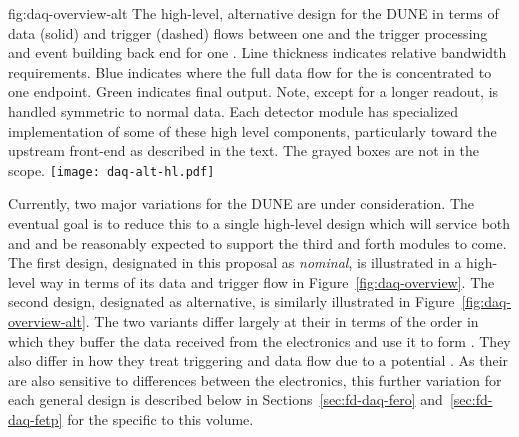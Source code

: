 \begin{dunefigure}{fig:daq-overview-alt}
  {The high-level, alternative design for the DUNE   in
    terms of data (solid) and trigger (dashed) flows between one
      and the trigger processing and event
    building back end for one . 
    Line thickness indicates relative bandwidth requirements.
    Blue indicates where the full data flow for the  is
    concentrated to one endpoint.
    Green indicates final output.
    Note, except for a longer readout,  is handled
    symmetric to normal data.
    Each detector module has specialized implementation of some of
    these high level components, particularly toward the upstream
    front-end as described in the text. 
    The grayed boxes are not in the  scope.
  }
  \texttt{[image: daq-alt-hl.pdf]}%
\end{dunefigure}

Currently, two major variations for the DUNE  are under consideration. %
The eventual goal is to reduce this to a single high-level design
which will service both \single and \dual {} and be reasonably
expected to support the third and forth modules to come.
The first design, designated in this proposal as \textit{nominal}, is
illustrated in a high-level way in terms of its data and trigger flow
in Figure~\ref{fig:daq-overview}. 
The second design, designated as alternative, is similarly
illustrated in Figure~\ref{fig:daq-overview-alt}. 
The two variants differ largely at their  in terms of the
order in which they buffer the data received from the  
electronics and use it to form . 
They also differ in how they treat triggering and data flow due to a
potential . 
As their  are also sensitive to differences between the
 electronics, this further variation for each general
design is described below in Sections~\ref{sec:fd-daq-fero}
and~\ref{sec:fd-daq-fetp} for the   specific to this volume.

